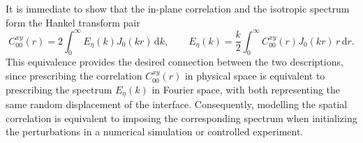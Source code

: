 It is immediate to show that the in-plane correlation and the isotropic spectrum form the Hankel transform pair
\begin{equation}
    C_{00}^{xy}(r)
    =
    2
    \int_0^\infty
        E_{\eta}(k)
        J_0(kr)
    \,\mathrm{d}k,
    \qquad
    E_{\eta}(k)
    =
    \frac{k}{2}
    \int_0^\infty
        C_{00}^{xy}(r)
        J_0(kr)\,
        r
    \,\mathrm{d}r.
    \label{eq:eta_hankel_transform_pair}
\end{equation}
This equivalence provides the desired connection between the two descriptions, since prescribing the correlation \(C_{00}^{xy}(r)\) in physical space is equivalent to prescribing the spectrum \(E_{\eta}(k)\) in Fourier space, with both representing the same random displacement of the interface. Consequently, modelling the spatial correlation is equivalent to imposing the corresponding spectrum when initializing the perturbations in a numerical simulation or controlled experiment.

